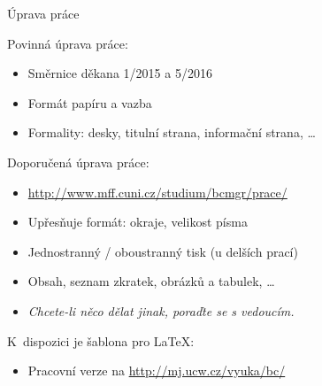\documentclass{beamer}
\begin{document}
\begin{frame}{Úprava práce}

Povinná úprava práce:

\begin{itemize}
\item Směrnice děkana 1/2015 a 5/2016
\item Formát papíru a vazba
\item Formality: desky, titulní strana, informační strana, \dots
\end{itemize}

Doporučená úprava práce:

\begin{itemize}
\item \url{http://www.mff.cuni.cz/studium/bcmgr/prace/}
\item Upřesňuje formát: okraje, velikost písma
\item Jednostranný / oboustranný tisk (u delších prací)
\item Obsah, seznam zkratek, obrázků a tabulek, \dots
\item {\it Chcete-li něco dělat jinak, poraďte se s vedoucím.}
\end{itemize}

K~dispozici je šablona pro \LaTeX:

\begin{itemize}
\item Pracovní verze na \url{http://mj.ucw.cz/vyuka/bc/}
\end{itemize}

\end{frame}
\end{document}
